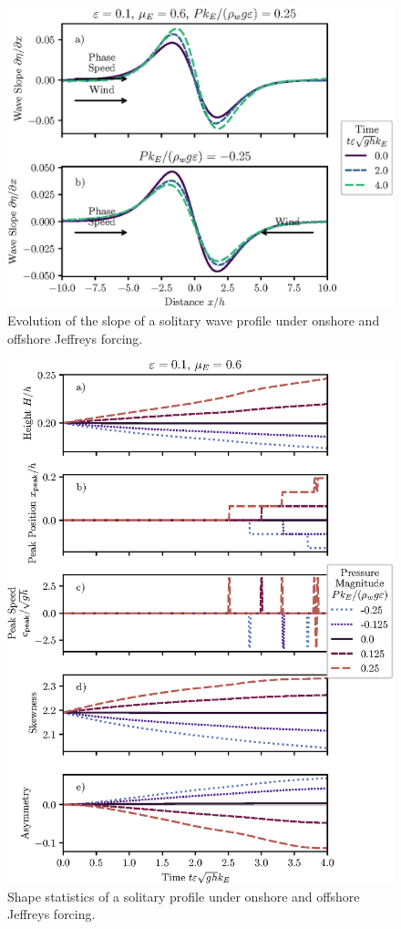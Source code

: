 \documentclass{jfm}
\begin{document}
\begin{figure}
  \centering
  \includegraphics{Slopes-Positive-Negative.eps}
  \caption{
    Evolution of the slope of a solitary wave profile under onshore and
    offshore Jeffreys forcing.
  }
\end{figure}

\begin{figure}
  \centering
  \includegraphics{Skew-Asymm.eps}
  \caption{
    Shape statistics of a solitary profile under onshore and offshore
    Jeffreys forcing.
  }
\end{figure}
\end{document}
